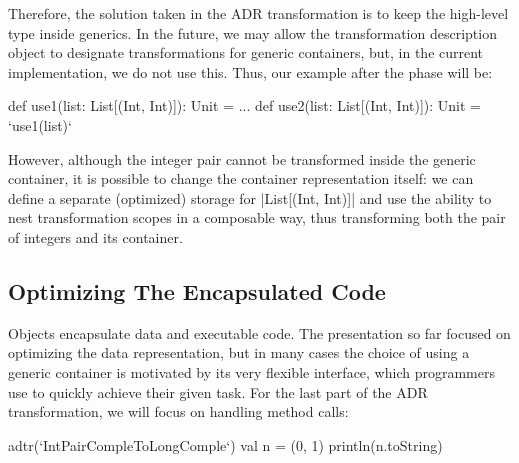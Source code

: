 Therefore, the solution taken in the ADR transformation is to keep the high-level type inside generics. In the future, we may allow the transformation description object to designate transformations for generic containers, but, in the current implementation, we do not use this. Thus, our example after the \commit{} phase will be:

\begin{lstlisting-nobreak}
def use1(list: List[(Int, Int)]): Unit = ...
def use2(list: List[(Int, Int)]): Unit = `use1(list)`
\end{lstlisting-nobreak}

However, although the integer pair cannot be transformed inside the generic container, it is possible to change the container representation itself: we can define a separate (optimized) storage for |List[(Int, Int)]| and use the ability to nest transformation scopes in a composable way, thus transforming both the pair of integers and its container.



\subsection{Optimizing The Encapsulated Code}
\label{sec:ildl:semantics}

Objects encapsulate data and executable code. The presentation so far focused on optimizing the data representation, but in many cases the choice of using a generic container is motivated by its very flexible interface, which programmers use to quickly achieve their given task. For the last part of the ADR transformation, we will focus on handling method calls:

\begin{lstlisting-nobreak}
adtr(`IntPairCompleToLongComple`) {
  val n = (0, 1)
  println(n.toString)
}
\end{lstlisting-nobreak}


